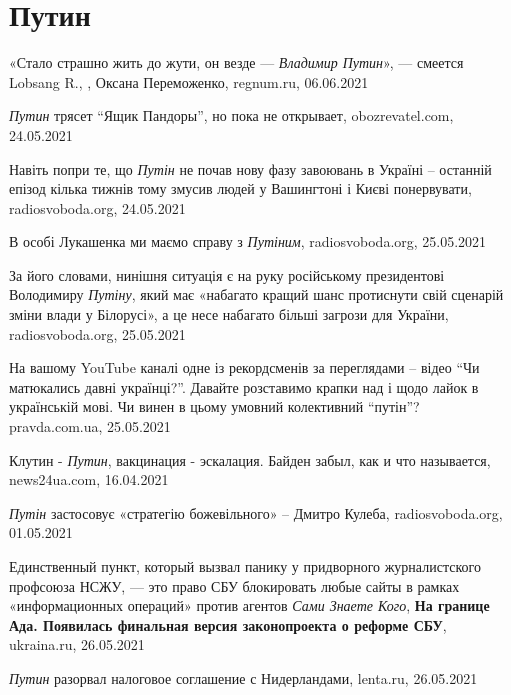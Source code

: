  
 
 
 
 
\chapter{Путин}

«Стало страшно жить до жути, он везде — \emph{Владимир Путин}», — смеется Lobsang R.,
, Оксана Переможенко, regnum.ru, 06.06.2021

\emph{Путин} трясет \enquote{Ящик Пандоры}, но пока не открывает,
obozrevatel.com, 24.05.2021

Навіть попри те, що \emph{Путін} не почав нову фазу завоювань в Україні –
останній епізод кілька тижнів тому змусив людей у Вашингтоні і Києві
понервувати, radiosvoboda.org, 24.05.2021

В особі Лукашенка ми маємо справу з \emph{Путіним}, radiosvoboda.org, 25.05.2021

За його словами, нинішня ситуація є на руку російському президентові Володимиру
\emph{Путіну}, який має «набагато кращий шанс протиснути свій сценарій зміни
влади у Білорусі», а це несе набагато більші загрози для України,
radiosvoboda.org, 25.05.2021

На вашому YouTube каналі одне із рекордсменів за переглядами – відео \enquote{Чи
матюкались давні українці?}. Давайте розставимо крапки над і щодо лайок в
українській мові. Чи винен в цьому умовний колективний \enquote{путін}?
pravda.com.ua, 25.05.2021

Клутин - \emph{Путин}, вакцинация - эскалация. Байден забыл, как и что
называется, news24ua.com, 16.04.2021

\emph{Путін} застосовує «стратегію божевільного» – Дмитро Кулеба, radiosvoboda.org, 01.05.2021

Единственный пункт, который вызвал панику у придворного журналистского
профсоюза НСЖУ, — это право СБУ блокировать любые сайты в рамках
«информационных операций» против агентов \emph{Сами Знаете Кого}, \textbf{На
границе Ада. Появилась финальная версия законопроекта о реформе СБУ},
ukraina.ru, 26.05.2021

\emph{Путин} разорвал налоговое соглашение с Нидерландами, lenta.ru, 26.05.2021

